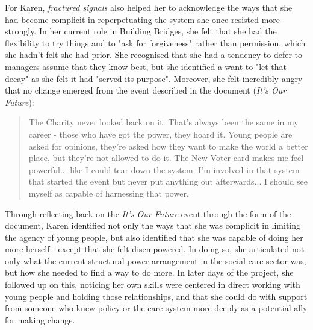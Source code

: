 For Karen, \textit{fractured signals} also helped her to acknowledge the ways that she had become complicit in reperpetuating the system she once resisted more strongly. In her current role in Building Bridges, she felt that she had the flexibility to try things and to "ask for forgiveness" rather than permission, which she hadn't felt she had prior. She recognised that she had a tendency to defer to managers assume that they know best, but she identified a want to "let that decay" as she felt it had "served its purpose". Moreover, she felt incredibly angry that no change emerged from the event described in the document (\textit{It's Our Future}):
\begin{quote}
The Charity never looked back on it. That's always been the same in my career - those who have got the power, they hoard it. Young people are asked for opinions, they're asked how they want to make the world a better place, but they're not allowed to do it. The New Voter card makes me feel powerful... like I could tear down the system. I'm involved in that system that started the event but never put anything out afterwards... I should see myself as capable of harnessing that power.
\end{quote}
Through reflecting back on the \textit{It's Our Future} event through the form of the document, Karen identified not only the ways that she was complicit in limiting the agency of young people, but also identified that she was capable of doing her more herself - except that she felt disempowered. In doing so, she articulated not only what the current structural power arrangement in the social care sector was, but how she needed to find a way to do more. In later days of the project, she followed up on this, noticing her own skills were centered in direct working with young people and holding those relationships, and that she could do with support from someone who knew policy or the care system more deeply as a potential ally for making change. 

